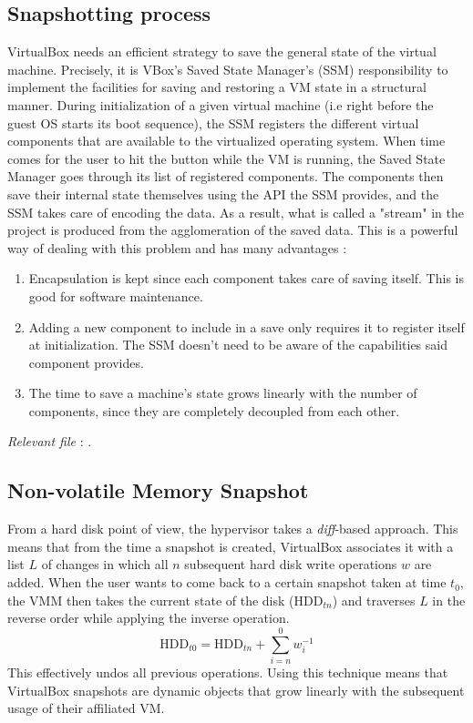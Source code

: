 \subsection*{Snapshotting process}

VirtualBox needs an efficient strategy to save the general state of the virtual machine. Precisely, it is VBox's Saved State Manager's (SSM) responsibility to implement the facilities for saving and restoring a VM state in a structural manner. During initialization of a given virtual machine (i.e right before the guest OS starts its boot sequence), the SSM registers the different virtual components that are available to the virtualized operating system. When time comes for the user to hit the  button while the VM is running, the Saved State Manager goes through its list of registered components. The components then save their internal state themselves using the API the SSM provides, and the SSM takes care of encoding the data. As a result, what is called a "stream" in the project is produced from the agglomeration of the saved data. This is a powerful way of dealing with this problem and has many advantages :
\begin{enumerate}
	\item Encapsulation is kept since each component takes care of saving itself. This is good for software maintenance.
	\item Adding a new component to include in a save only requires it to register itself at initialization. The SSM doesn't need to be aware of the capabilities said component provides.
	\item The time to save a machine's state grows linearly with the number of components, since they are completely decoupled from each other.
\end{enumerate}
\hfill\textit{Relevant file }: .

\subsection*{Non-volatile Memory Snapshot}
From a hard disk point of view, the hypervisor takes a \textit{diff}-based approach. This means that from the time a snapshot is created, VirtualBox associates it with a list $L$ of changes in which all $n$  subsequent hard disk write operations $w$ are added. When the user wants to come back to a certain snapshot taken at time $t_0$, the \gls{VMM} then takes the current state of the disk ($\text{HDD}_{tn}$) and traverses $L$ in the reverse order while applying the inverse operation.
\[
\text{HDD}_{t0} = \text{HDD}_{tn} + \sum_{i=n}^{0}w_i^{-1}
\]
This effectively undos all previous operations. Using this technique means that VirtualBox snapshots are dynamic objects that grow linearly with the subsequent usage of their affiliated VM.

